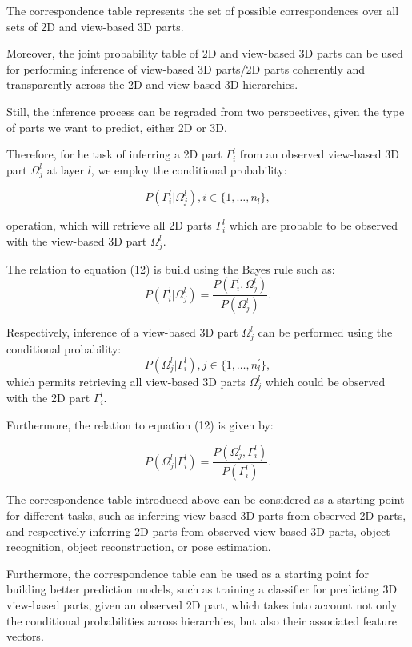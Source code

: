 \documentclass[runningheads]{llncs}
\begin{document}
The correspondence table represents the set of possible correspondences over all sets of 2D and view-based 3D parts.  

Moreover, the joint probability table of 2D and view-based 3D parts can be used for performing inference of view-based 3D parts/2D parts coherently and transparently across the 2D and view-based 3D hierarchies.

Still, the inference process can be regraded from two perspectives, given the type of parts we want to predict, either 2D or 3D. 

Therefore, for he task of inferring a 2D part $\Gamma_i^l$ from an observed view-based 3D part $\Omega_j^l$ at layer $l$, we employ the conditional probability:

\begin{equation}
P(\Gamma_i^l \vert \Omega_j^l), i \in \{1,\dots,n_l\},
\end{equation}

operation, which will retrieve all 2D parts $\Gamma_i^l$ which are probable to be observed with the view-based 3D part $\Omega_j^l$. 

The relation to equation (12) is build using the Bayes rule such as:
\begin{equation}
P(\Gamma_i^l \vert \Omega_j^l)= \frac{P(\Gamma_i^l,\Omega_j^l)}{P(\Omega_j^l)}.
\end{equation}

Respectively, inference of a view-based 3D part $\Omega_j^l$ can be performed using the conditional probability:
\begin{equation}
 P(\Omega_j^l \vert \Gamma_i^l), j \in \{1,\dots,n_{l}^{'}\},
\end{equation} 
which permits retrieving all view-based 3D parts $\Omega_j^l$ which could be observed with the 2D part $\Gamma_i^l$. 

Furthermore, the relation to equation (12) is given by:

\begin{equation}
 P(\Omega_j^l \vert \Gamma_i^l)=\frac{P(\Omega_j^l,\Gamma_i^l)}{P(\Gamma_i^l)}.
\end{equation} 
 
The correspondence table introduced above can be considered as a starting point for different tasks, such as inferring view-based 3D parts from observed 2D parts, and respectively inferring 2D parts from observed view-based 3D parts, object recognition, object reconstruction, or pose estimation. 

Furthermore, the correspondence table can be used as a starting point for building better prediction models, such as training a classifier for predicting 3D view-based parts, given an observed 2D part, which takes into account not only the conditional probabilities across hierarchies, but also their associated feature vectors.
\end{document}
